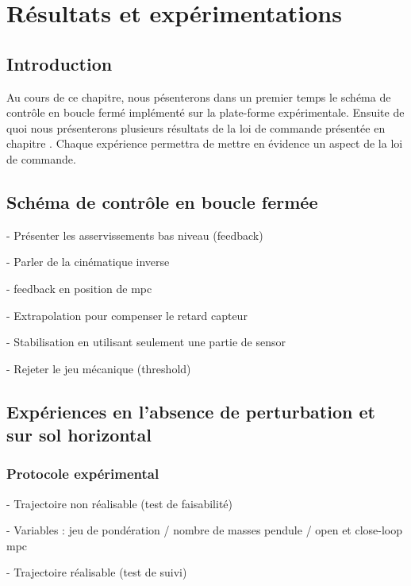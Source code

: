 \chapter{Résultats et expérimentations}
\label{chapitre.resultats}
	\section{Introduction}
	
	Au cours de ce chapitre, nous pésenterons dans un premier temps le schéma de contrôle en boucle fermé implémenté sur la plate-forme expérimentale.
	Ensuite de quoi nous présenterons plusieurs résultats de la loi de commande présentée en chapitre .
	Chaque expérience permettra de mettre en évidence un aspect de la loi de commande.
	
	\section{Schéma de contrôle en boucle fermée}
	\label{section.closedloop}
	
					
	- Présenter les asservissements bas niveau (feedback)
	
	- Parler de la cinématique inverse
	
	- feedback en position de mpc
	
	- Extrapolation pour compenser le retard capteur
	
	- Stabilisation en utilisant seulement une partie de sensor
	
	- Rejeter le jeu mécanique (threshold)
	
	\section{Expériences en l'absence de perturbation et sur sol horizontal}
		\subsection{Protocole expérimental}
		
			- Trajectoire non réalisable (test de faisabilité)
			
			- Variables : jeu de pondération / nombre de masses pendule / open et close-loop mpc
			
			- Trajectoire réalisable (test de suivi)
			
